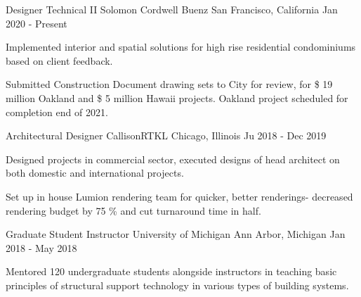 \vspace{-2mm}

\begin{cventries}

  \cventry
    {Designer Technical II} %
    {Solomon Cordwell Buenz} %
    {San Francisco, California} %
    {Jan 2020 - Present} %
    {
      \begin{cvitems} %
        \item {Implemented interior and spatial solutions for high rise residential condominiums based on client feedback.}
        \item {Submitted Construction Document drawing sets to City for review, for \$ 19 million Oakland and \$ 5 million Hawaii projects. Oakland project scheduled for completion end of 2021.}        
      \end{cvitems}
    }

  \cventry
    {Architectural Designer} %
    {CallisonRTKL} %
    {Chicago, Illinois} %
    {Ju 2018 - Dec 2019} %
    {
      \begin{cvitems} %
        \item {Designed projects in commercial sector, executed designs of head architect on both domestic and international projects.}
        \item {Set up in house Lumion rendering team for quicker, better renderings- decreased rendering budget by 75 \% and cut turnaround time in half.}
      \end{cvitems}
    }

  \cventry
	{Graduate Student Instructor} %
	{University of Michigan} %
	{Ann Arbor, Michigan} %
	{Jan 2018 - May 2018} %
	{
		\begin{cvitems} %
			\item {Mentored 120 undergraduate students alongside instructors in teaching basic principles of structural support technology in various types of building systems.}
		\end{cvitems}
	}

\vspace{-4mm}

\end{cventries}
